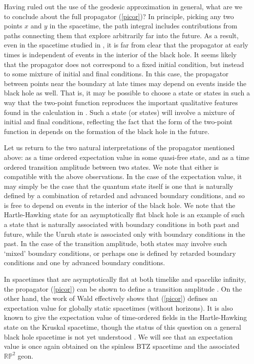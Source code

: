 \documentclass[a4paper,12pt]{article}
\begin{document}
Having ruled out the use of the geodesic approximation in general,
what are we to conclude about the full propagator (\ref{picor})?  In
principle, picking any two points $x$ and $y$ in the spacetime, the
path integral includes contributions from paths connecting them that
explore arbitrarily far into the future.  As a result, even in the
spacetime studied in \cite{holopart}, it is far from clear that the
propagator at early times is independent of events in the interior of
the black hole.  It seems likely that the propagator does not
correspond to a fixed initial condition, but instead to some mixture
of initial and final conditions.  In this case, the propagator between
points near the boundary at late times may depend on events inside the
black hole as well. That is, it may be possible to choose a state or
states in such a way that the two-point function reproduces the
important qualitative features found in the calculation in
\cite{holopart}. Such a state (or states) will involve a mixture of
initial and final conditions, reflecting the fact that the form of the
two-point function in \cite{holopart} depends on the formation of the
black hole in the future.

Let us return to the two natural interpretations of the propagator
mentioned above: as a time ordered expectation value in some
quasi-free state, and as a time ordered transition amplitude between
two states.  We note that either is compatible with the above
observations.  In the case of the expectation value, it may simply be
the case that the quantum state itself is one that is naturally
defined by a combination of retarded and advanced boundary conditions,
and so is free to depend on events in the interior of the black hole.
We note that the Hartle-Hawking state for an asymptotically flat black
hole is an example of such a state that is naturally associated with
boundary conditions in both past and future, while the Unruh state is
associated only with boundary conditions in the past.  In the case of
the transition amplitude, both states may involve such `mixed'
boundary conditions, or perhaps one is defined by retarded boundary
conditions and one by advanced boundary conditions.

In spacetimes that are asymptotically flat at both timelike and
spacelike infinity, the propagator (\ref{picor}) can be shown to
define a transition amplitude \cite{DeWitt}.  On the other hand, the
work of Wald \cite{Wald2} effectively shows that (\ref{picor}) defines
an expectation value for globally static spacetimes (without
horizons). It is also known to give the expectation value of
time-ordered fields in the Hartle-Hawking state on the Kruskal
spacetime, though the status of this question on a general black hole
spacetime is not yet understood \cite{RMW}.  We will see that an
expectation value is once again obtained on the spinless BTZ spacetime
and the associated $\mathbb R \mathbb P^2$ geon.
\end{document}
